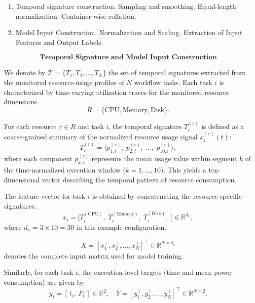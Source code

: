 \begin{enumerate}
    \item Temporal signature construction.
          \subitem Sampling and smoothing.
          \subitem Equal-length normalization.
          \subitem Container-wise collation.
    \item Model Input Construction.
          \subitem Normalization and Scaling.
          \subitem Extraction of Input Features and Output Labels.
\end{enumerate}


\[
    \textbf{Temporal Signature and Model Input Construction}
\]

We denote by \( \mathcal{T} = \{ T_1, T_2, \dots, T_N \} \) the set of
temporal signatures extracted from the monitored resource-usage profiles
of \( N \) workflow tasks.
Each task \( i \) is characterized by time-varying utilization traces
for the monitored resource dimensions
\[
    R = \{ \text{CPU}, \text{Memory}, \text{Disk} \}.
\]

\noindent
For each resource \( r \in R \) and task \( i \),
the temporal signature \( T_i^{(r)} \) is defined as a
coarse-grained summary of the normalized resource usage signal
\( x_i^{(r)}(t) \):
\[
    T_i^{(r)} =
    \bigl\langle
    p_{1,i}^{(r)},\;
    p_{2,i}^{(r)},\;
    \dots,\;
    p_{10,i}^{(r)}
    \bigr\rangle,
    \tag{1}
\]
where each component \( p_{k,i}^{(r)} \) represents the mean
usage value within segment \( k \) of the time-normalized
execution window (\( k = 1, \dots, 10 \)).
This yields a ten-dimensional vector describing the temporal pattern of
resource consumption.

\noindent
The feature vector for task \( i \) is obtained by concatenating
the resource-specific signatures:
\[
    x_i =
    \bigl[
    T_i^{(\text{CPU})},\;
    T_i^{(\text{Memory})},\;
    T_i^{(\text{Disk})},\;
    \bigr]
    \in \mathbb{R}^{d_x},
\]
where \( d_x = 3 \times 10 = 30 \) in this example configuration.

\[
    X =
    [x_1^\top, x_2^\top, \dots, x_N^\top]^\top
    \in \mathbb{R}^{N \times d_x}
\]
denotes the complete input matrix used for model training.

Similarly, for each task \( i \), the execution-level targets
(time and mean power consumption) are given by
\[
    y_i = [\,t_i,\, P_i\,] \in \mathbb{R}^2,
    \quad
    Y = [y_1^\top, y_2^\top, \dots, y_N^\top]^\top
    \in \mathbb{R}^{N \times 2}.
\]

